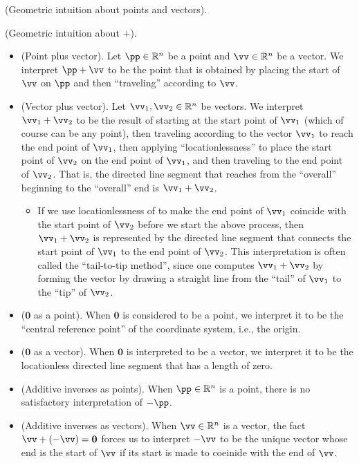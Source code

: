 \begin{remark}
\label{ch::lin_alg::rmk::geometric_intuition_points_vectors}
    (Geometric intuition about points and vectors).
        
    (Geometric intuition about $+$).
    \begin{itemize}
        \item (Point plus vector). Let $\pp \in \R^n$ be a point and $\vv \in \R^n$ be a vector. We interpret $\pp + \vv$ to be the point that is obtained by placing the start of $\vv$ on $\pp$ and then ``traveling'' according to $\vv$.
        \item (Vector plus vector). Let $\vv_1, \vv_2 \in \R^n$ be vectors. We interpret $\vv_1 + \vv_2$ to be the result of starting at the start point of $\vv_1$ (which of course can be any point), then traveling according to the vector $\vv_1$ to reach the end point of $\vv_1$, then applying ``locationlessness'' to place the start point of $\vv_2$ on the end point of $\vv_1$, and then traveling to the end point of $\vv_2$. That is, the directed line segment that reaches from the ``overall'' beginning to the ``overall'' end is $\vv_1 + \vv_2$.
        \begin{itemize}
            \item If we use locationlessness of to make the end point of $\vv_1$ coincide with the start point of $\vv_2$ before we start the above process, then $\vv_1 + \vv_2$ is represented by the directed line segment that connects the start point of $\vv_1$ to the end point of $\vv_2$. This interpretation is often called the ``tail-to-tip method'', since one computes $\vv_1 + \vv_2$ by forming the vector by drawing a straight line from the “tail” of $\vv_1$ to the “tip” of $\vv_2$.
        \end{itemize}
        \item ($\mathbf{0}$ as a point). When $\mathbf{0}$ is considered to be a point, we interpret it to be the ``central reference point'' of the coordinate system, i.e., the origin.
        \item ($\mathbf{0}$ as a vector). When $\mathbf{0}$ is interpreted to be a vector, we interpret it to be the locationless directed line segment that has a length of zero.
        \item (Additive inverses as points). When $\pp \in \R^n$ is a point, there is no satisfactory interpretation of $-\pp$.
        \item (Additive inverses as vectors). When $\vv \in \R^n$ is a vector, the fact $\vv + (-\vv) = \mathbf{0}$ forces us to interpret $-\vv$ to be the unique vector whose end is the start of $\vv$ if its start is made to coeinide with the end of $\vv$.
    \end{itemize}


\end{remark}
